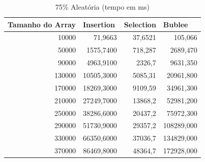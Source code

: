 \documentclass[a4paper, 12pt]{article}
\begin{document}
\begin{longtable}[c]{rrrr}
	\caption{75\% Aleatória (tempo em ms)}
	\label{tab:aleatoria751-table}\\
	\hline
	\multicolumn{1}{l}{\textbf{Tamanho do Array}} & \multicolumn{1}{l}{\textbf{Insertion}} & \multicolumn{1}{l}{\textbf{Selection}} & \multicolumn{1}{l}{\textbf{Bublee}} \\ \hline
	\endfirsthead
	\endhead
	\multicolumn{1}{|r|}{10000}                   & \multicolumn{1}{r|}{71,9663}           & \multicolumn{1}{r|}{37,6521}           & \multicolumn{1}{r|}{105,066}        \\ \hline
	\multicolumn{1}{|r|}{50000}                   & \multicolumn{1}{r|}{1575,7400}         & \multicolumn{1}{r|}{718,287}           & \multicolumn{1}{r|}{2689,470}       \\ \hline
	\multicolumn{1}{|r|}{90000}                   & \multicolumn{1}{r|}{4963,9100}         & \multicolumn{1}{r|}{2326,7}            & \multicolumn{1}{r|}{9631,350}       \\ \hline
	\multicolumn{1}{|r|}{130000}                  & \multicolumn{1}{r|}{10505,3000}        & \multicolumn{1}{r|}{5085,31}           & \multicolumn{1}{r|}{20961,800}      \\ \hline
	\multicolumn{1}{|r|}{170000}                  & \multicolumn{1}{r|}{18269,3000}        & \multicolumn{1}{r|}{9109,59}           & \multicolumn{1}{r|}{34961,300}      \\ \hline
	\multicolumn{1}{|r|}{210000}                  & \multicolumn{1}{r|}{27249,7000}        & \multicolumn{1}{r|}{13868,2}           & \multicolumn{1}{r|}{52981,200}      \\ \hline
	\multicolumn{1}{|r|}{250000}                  & \multicolumn{1}{r|}{38286,6000}        & \multicolumn{1}{r|}{20437,2}           & \multicolumn{1}{r|}{75972,300}      \\ \hline
	\multicolumn{1}{|r|}{290000}                  & \multicolumn{1}{r|}{51730,9000}        & \multicolumn{1}{r|}{29357,2}           & \multicolumn{1}{r|}{108289,000}     \\ \hline
	\multicolumn{1}{|r|}{330000}                  & \multicolumn{1}{r|}{66350,6000}        & \multicolumn{1}{r|}{37036,7}           & \multicolumn{1}{r|}{134829,000}     \\ \hline
	\multicolumn{1}{|r|}{370000}                  & \multicolumn{1}{r|}{86469,8000}        & \multicolumn{1}{r|}{48364,7}           & \multicolumn{1}{r|}{172928,000}     \\ \hline

\end{longtable}
\end{document}
